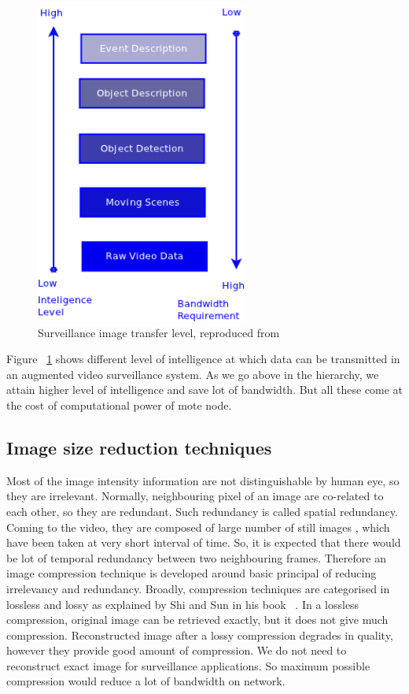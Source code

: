 \pagebreak

\begin{figure}[!t]
\centering
\includegraphics[height=300pt]{Figures/image_tr_level}
\caption{Surveillance image transfer level, reproduced from ~\cite{3}}
\label{image_tr_level}
\end{figure}

\indent Figure ~\ref{image_tr_level} shows different level of
intelligence at which data can be transmitted in an augmented video
surveillance system. As we go above in the hierarchy, we attain higher
level of intelligence and save lot of bandwidth. But all these come at
the cost of computational power of mote node.\\

\subsection{Image size reduction techniques}
\indent Most of the image intensity information are not distinguishable
by human eye, so they are irrelevant. Normally, neighbouring pixel of an
image are co-related to each other, so they are redundant. Such
redundancy is called spatial redundancy. Coming to the video, they are
composed of large number of still images , which have been taken at very
short interval of time. So, it is expected that there would be lot of
temporal redundancy between two neighbouring frames.  Therefore an image
compression technique is developed around basic principal of reducing
irrelevancy and redundancy. Broadly, compression techniques are
categorised in lossless and lossy as explained by Shi and Sun in his
book ~\cite{6}. In a lossless compression, original image can be
retrieved exactly, but it does not give much compression.  Reconstructed
image after a lossy compression degrades in quality, however they
provide good amount of compression. We do not need to reconstruct exact
image for surveillance applications. So maximum possible compression
would reduce a lot of bandwidth on network.\\

